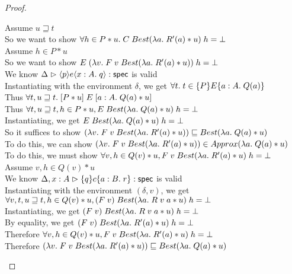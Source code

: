 \begin{proof}
\begin{tabbedproof}
    \ooooo Assume $u \sqsupseteq t$ \\
    \oooooo So we want to show $\forall h \in P * u.\; C\;Best(\semfun{a}{R'(a) * u})\;h = \bot$\\
    \oooooo Assume $h \in P * u$ \\
    \ooooooo So we want to show $E\;(\semfun{v}{F\;v\;Best(\semfun{a}{R'(a)*u})})\;h = \bot$ \\
    \ooooooo We know $\judgeS{\mspec{p}{e}{x:A}{q}}$ is valid \\
    \ooooooo Instantiating with the environment $\delta$, we get $\forall t.\; t \in \spec{P}{E}{a:A}{Q(a)}$ \\
    \ooooooo Thus $\forall t, u \sqsupseteq t.\; \basicspec{P * u}{E}{a:A}{Q(a) * u}$ \\
    \ooooooo Thus $\forall t, u \sqsupseteq t, h \in P * u, E\;Best(\semfun{a}{Q(a) * u})\;h = \bot$ \\
    \ooooooo Instantiating, we get $E\;Best(\semfun{a}{Q(a) * u})\;h = \bot$ \\
    \ooooooo So it suffices to show $(\semfun{v}{F\;v\;Best(\semfun{a}{R'(a)*u})}) \sqsubseteq 
                                Best(\semfun{a}{Q(a) * u})$ \\
    \ooooooo To do this, we can show $(\semfun{v}{F\;v\;Best(\semfun{a}{R'(a)*u})}) \in Approx(\semfun{a}{Q(a) * u})$ \\
    \ooooooo To do this, we must show $\forall v, h \in Q(v) * u, F\;v\;Best(\semfun{a}{R'(a)*u})\;h = \bot$ \\
    \ooooooo Assume $v, h \in Q(v) * u$ \\
    \oooooooo We know $\judgeS[\Delta,x:A]{\spec{q}{c}{a:B}{r}}$ is valid\\
    \oooooooo Instantiating with the environment $(\delta, v)$, we get \\
    \oooooooox $\forall v, t, u \sqsupseteq t, h \in Q(v) * u, (F\;v)\;Best(\semfun{a}{R\;v\;a * u})\;h = \bot$ \\
    \oooooooo Instantiating, we get $(F\;v)\;Best(\semfun{a}{R\;v\;a * u})\;h = \bot$ \\
    \oooooooo By equality, we get $(F\;v)\;Best(\semfun{a}{R'(a) * u})\;h = \bot$ \\
    \ooooooo Therefore $\forall v, h \in Q(v) * u, F\;v\;Best(\semfun{a}{R'(a)*u})\;h = \bot$ \\
    \ooooooo Therefore $(\semfun{v}{F\;v\;Best(\semfun{a}{R'(a)*u})}) \sqsubseteq 
                                Best(\semfun{a}{Q(a) * u})$ \\

\end{tabbedproof}
\end{proof}
